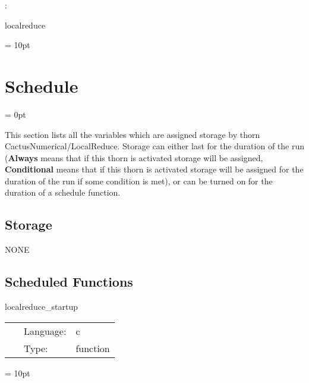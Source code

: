 : 

localreduce
\vspace{2mm}

\vspace{5mm}\parskip = 10pt 

\section{Schedule} 


\parskip = 0pt


\noindent This section lists all the variables which are assigned storage by thorn CactusNumerical/LocalReduce.  Storage can either last for the duration of the run ({\bf Always} means that if this thorn is activated storage will be assigned, {\bf Conditional} means that if this thorn is activated storage will be assigned for the duration of the run if some condition is met), or can be turned on for the duration of a schedule function.


\subsection*{Storage}NONE
\subsection*{Scheduled Functions}
\vspace{5mm}


\hspace{5mm} localreduce\_startup 

\hspace{5mm}{\it startup routine } 


\hspace{5mm}

 \begin{tabular*}{160mm}{cll} 
~ & Language:  & c \\ 
~ & Type:  & function \\ 
\end{tabular*} 



\vspace{5mm}\parskip = 10pt 

